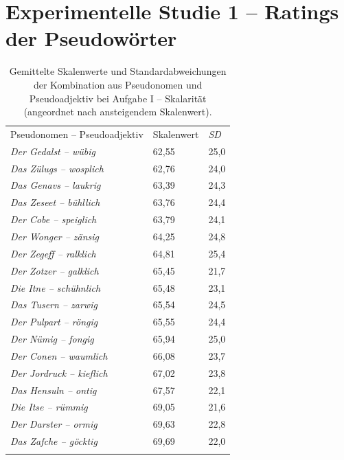 \chapter{{Experimentelle Studie 1 -- Ratings der Pseudowörter}}  \label{Pseu1}
\begin{table}
\begin{tabularx}{.8\textwidth}{lYY}
\lsptoprule
      \\
   \midrule
{Pseudonomen -- Pseudoadjektiv} & Skalenwert  &   \textit{SD} \\
\midrule
   \textit{Der Gedalst -- wübig} &   62,55   & 25,0  \\
                        \textit{Das Zülugs -- wosplich} &  62,76    & 24,0 \\
    \textit{Das Genavs -- laukrig} &  63,39    & 24,3 \\
                        \textit{Das Zeseet -- bühllich} &   63,76    & 24,4  \\
     \textit{Der Cobe -- speiglich} &  63,79    & 24,1 \\
                        \textit{Der Wonger -- zänsig} &  64,25    & 24,8  \\
     \textit{Der Zegeff -- ralklich} &  64,81    & 25,4   \\
                        \textit{Der Zotzer -- galklich} &  65,45    & 21,7  \\
      \textit{Die Itne -- schühnlich} &  65,48  & 23,1   \\
                          \textit{Das Tusern -- zarwig} &  65,54    & 24,5  \\
      \textit{Der Pulpart -- röngig} & 65,55   & 24,4  \\
                           \textit{Der Nümig -- fongig} &  65,94    & 25,0  \\
         \textit{Der Conen -- waumlich} &  66,08 & 23,7   \\
                             \textit{Der Jordruck -- kieflich} &  67,02    & 23,8  \\
        \textit{Das Hensuln -- ontig} &  67,57  & 22,1  \\
                            \textit{Die Itse -- rümmig} &  69,05   & 21,6  \\
        \textit{Der Darster -- ormig} &  69,63    & 22,8  \\
                          \textit{Das Zafche -- göcktig} &  69,69    & 22,0  \\
\lspbottomrule
\end{tabularx}
\caption[Gemittelte Skalenwerte der Pseudowörter bei {Aufgabe I} von Experiment 1]{Gemittelte Skalenwerte und Standardabweichungen der Kombination aus Pseudonomen und Pseudoadjektiv bei Aufgabe I -- Skalarität (angeordnet nach ansteigendem Skalenwert).}
\label{Pseudos1}
\end{table}

